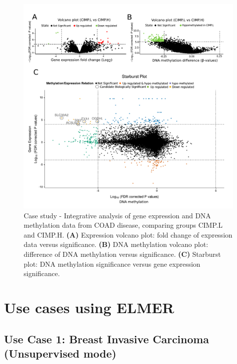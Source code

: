 \begin{figure}
\centering
\includegraphics[width=1.0\linewidth]{images/figure5.pdf}
\caption[Case study - Integrative data analysis of Colon Adenocarcinoma]{
Case study - Integrative analysis of gene expression and DNA methylation data from COAD disease,
comparing groups CIMP.L and CIMP.H. \textbf{(A)} Expression volcano plot: fold change of expression data versus significance.
 \textbf{(B)} DNA methylation volcano plot: difference of DNA methylation versus significance.
 \textbf{(C)} Starburst plot: DNA methylation significance versus gene expression significance.}
\label{fig:case_starburst}
\end{figure}


\section{Use cases using ELMER}\label{sec:analysis_elmer}

\subsection{Use Case 1: Breast Invasive Carcinoma (Unsupervised mode)} 


